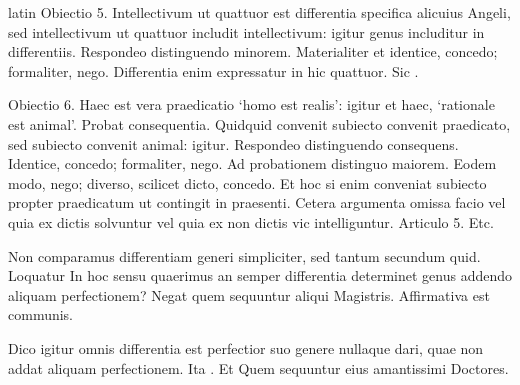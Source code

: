 \begin{otherlanguage*}{latin}
\pstart
 Obiectio 5. Intellectivum ut quattuor est differentia specifica alicuius Angeli, sed intellectivum ut quattuor includit intellectivum: igitur genus includitur in differentiis. Respondeo distinguendo minorem. Materialiter et identice, concedo; formaliter, nego. Differentia enim expressatur in hic quattuor. Sic . 
\pend

\pstart
 Obiectio 6. Haec est vera praedicatio `homo est realis': igitur et haec, `rationale est animal'. Probat consequentia. Quidquid convenit subiecto convenit praedicato, sed subiecto convenit animal: igitur. Respondeo distinguendo consequens. Identice, concedo; formaliter, nego. Ad probationem distinguo maiorem. Eodem modo, nego; diverso, scilicet dicto, concedo. Et hoc si enim conveniat subiecto propter praedicatum ut contingit in praesenti. Cetera argumenta omissa facio vel quia ex dictis solvuntur vel quia ex non dictis vic intelliguntur. Articulo 5. Etc. 
\pend

        \pstart
        \pend
      
\pstart
 Non comparamus differentiam generi simpliciter, sed tantum secundum quid. Loquatur  In hoc sensu quaerimus an semper differentia determinet genus addendo aliquam perfectionem? Negat  quem sequuntur aliqui Magistris. Affirmativa est communis. 
\pend

\pstart
 Dico igitur omnis differentia est perfectior suo genere nullaque dari, quae non addat aliquam perfectionem. Ita . Et  Quem sequuntur eius amantissimi Doctores. 
\pend


\end{otherlanguage*}
